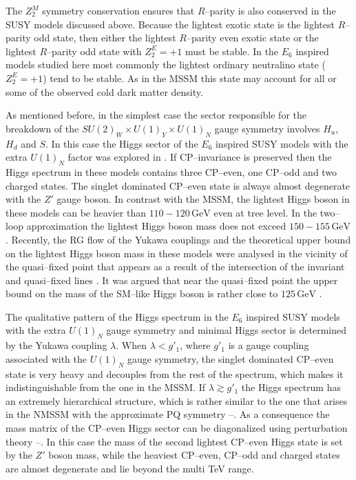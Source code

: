 \documentclass[12pt,a4paper]{article}
\begin{document}
The $Z_{2}^{M}$ symmetry conservation ensures that $R$--parity is also conserved in the SUSY models
discussed above. Because the lightest exotic state is the lightest $R$--parity odd 
state, then either the lightest
$R$--parity even exotic state or the lightest $R$--parity odd state with $Z_{2}^{E}=+1$ must be
stable. In the $E_6$ inspired models studied here most commonly the lightest ordinary neutralino state
($Z_{2}^{E}=+1$) tend to be stable. As in the MSSM this state may account for all or some
of the observed cold dark matter density.

As mentioned before, in the simplest case the sector responsible for the breakdown of the
$SU(2)_W\times U(1)_Y\times U(1)_{N}$ gauge symmetry involves $H_u$, $H_d$ and $S$. In this case
the Higgs sector of the $E_6$ inspired SUSY models with the extra $U(1)_{N}$ factor was explored in \cite{King:2005jy}.
If CP--invariance is preserved then the Higgs spectrum in these models contains three CP--even, one CP--odd
and two charged states.  The singlet dominated CP--even state is always almost degenerate with the $Z'$ gauge
boson. In contrast with the MSSM, the lightest Higgs boson in these models can be heavier than $110-120\,\mbox{GeV}$
even at tree level. In the two--loop approximation the lightest Higgs boson mass does not exceed $150-155\,\mbox{GeV}$
\cite{King:2005jy}. Recently, the RG flow of the Yukawa couplings and the theoretical upper bound on
the lightest Higgs boson mass in these models were analysed in the vicinity of the quasi--fixed point \cite{Nevzorov:2013ixa}
that appears as a result of the intersection of the invariant and quasi--fixed lines \cite{Nevzorov:2001vj}.
It was argued that near the quasi--fixed point the upper bound on the mass of the SM--like Higgs boson is
rather close to $125\,\mbox{GeV}$ \cite{Nevzorov:2013ixa}.

The qualitative pattern of the Higgs spectrum
in the $E_6$ inspired SUSY models with the extra $U(1)_{N}$ gauge symmetry and minimal Higgs sector
is determined by the Yukawa coupling $\lambda$. When $\lambda < g'_1$, where $g'_1$ is a gauge coupling
associated with the $U(1)_{N}$ gauge symmetry, the singlet dominated CP--even state is very heavy and
decouples from the rest of the spectrum, which makes it indistinguishable from the one in the MSSM. If $\lambda\gtrsim g'_1$
the Higgs spectrum has an extremely hierarchical structure, which is rather similar to the one that arises in the NMSSM
with the approximate PQ symmetry \cite{Miller:2005qua}--\cite{Nevzorov:2004ge}. As a consequence
the mass matrix of the CP--even Higgs sector can be diagonalized using perturbation theory
\cite{Nevzorov:2004ge}--\cite{Nevzorov:2001um}. In this case the mass of the second lightest CP--even
Higgs state is set by the $Z'$ boson mass, while the heaviest CP--even, CP--odd and charged states
are almost degenerate and lie beyond the multi TeV range.
\end{document}
